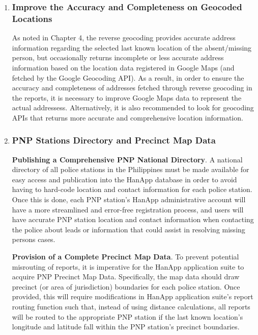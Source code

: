 \begin{enumerate}
    \item \subsubsection{Improve the Accuracy and Completeness on Geocoded Locations}
As noted in Chapter 4, the reverse geocoding provides accurate address information regarding the selected last known location of the absent/missing person, but occasionally returns incomplete or less accurate address information based on the location data registered in Google Maps (and fetched by the Google Geocoding API). As a result, in order to ensure the accuracy and completeness of addresses  fetched through reverse geocoding in the reports, it is necessary to improve Google Maps data to represent the actual addressess. Alternatively, it is also  recommended to look for geocoding APIs that returns more accurate and comprehensive location information.

    \item \subsubsection{PNP Stations Directory and Precinct Map Data}
\textbf{Publishing a Comprehensive PNP National Directory}. A national directory of all police stations in the Philippines must be made available for easy access and publication into the HanApp database in order to avoid having to hard-code location and contact information for each police station. Once this is done, each PNP station's HanApp administrative account will have a more streamlined and error-free registration process, and users will have accurate PNP station location and contact information when contacting the police about leads or information that could assist in resolving missing persons cases.

\textbf{Provision of a Complete Precinct Map Data}. To prevent potential misrouting of reports, it is imperative for the HanApp application suite to acquire PNP Precinct Map Data. Specifically, the map data should draw precinct (or area of jurisdiction) boundaries for each police station. Once provided, this will require modifications in HanApp application suite’s report routing function such that, instead of using distance calculations, all reports will be routed to the appropriate PNP station if the last known location’s longitude and latitude fall within the PNP station’s precinct boundaries.


\end{enumerate}
